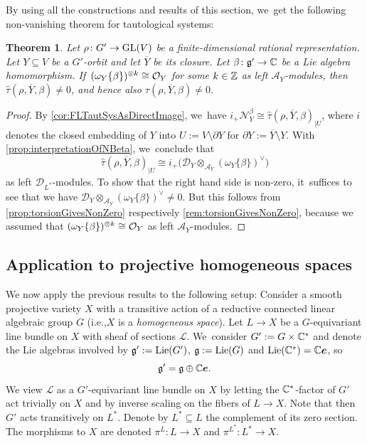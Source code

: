\documentclass[11pt]{article}
\newcommand{\ie}{i.e.,\xspace}
\newcommand{\bme}{{\boldsymbol{e}}}
\newtheorem{thm}{Theorem}[section]
\newcommand{\cA}{\mathscr{A}}
\newcommand{\Ell}{\mathscr{L}}
\newcommand{\frg}{\mathfrak{g}}
\DeclareMathOperator{\GL}{\textup{GL}}
\DeclareMathOperator{\Lie}{\textup{Lie}}
\newcommand\restr[2]{{#1_{| {#2}}}}
\begin{document}
By using all the constructions and results of this section, we~get the following non-vanishing theorem for tautological systems:

\begin{thm} \label{thm:nonZeroGeneralSetup}
Let $\rho \colon G' \to \GL(V)$ be a finite-dimensional rational representation. Let $Y \subseteq V$ be a $G'$-orbit and let $\overline{Y}$ be its closure. Let $\beta \colon \frg' \to \C$ be a Lie algebra homomorphism. If~$(\omega_Y\{\beta\})^{\otimes k} \cong \mathcal{O}_Y$ for some $k\in {\mathbb Z}$ as left $\cA_Y$\nobreakdash-mod\-ules,
then $\hat{\tau}(\rho, \overline{Y}, \beta) \neq 0$, and hence also $\tau(\rho, \overline{Y}, \beta) \neq 0$.
\end{thm}

\begin{proof}
By \cref{cor:FLTautSysAsDirectImage}, we~have $i_+ \mathscr N_Y^{\beta} \cong \restr{\hat\tau(\rho,\overline Y, \beta)}{U}$, where $i$ denotes the closed embedding of $Y$ into $U := V \setminus \partial Y$ for $\partial Y := \overline Y \setminus Y$. With \cref{prop:interpretationOfNBeta}, we~conclude that
\[
\restr{\hat{\tau}(\rho,\overline Y,\beta)}{U} \cong i_+\big(\mathscr{D}_{Y} \otimes_{\cA_{Y}} (\omega_{Y}\{\beta\})^\vee\big)
\]
as left $\mathscr{D}_{L^*}$\nobreakdash-mod\-ules. To show that the right hand side is non-zero, it~suffices to see that we have $\mathscr{D}_{Y} \otimes_{\cA_{Y}} (\omega_{Y}\{\beta\})^\vee \neq 0$.
But this follows from \cref{prop:torsionGivesNonZero} respectively \cref{rem:torsionGivesNonZero}, because we assumed that $(\omega_{Y}\{\beta\})^{\otimes k} \cong \mathcal{O}_Y$ as left $\cA_Y$\nobreakdash-mod\-ules.
\end{proof}

\subsection{Application to projective homogeneous spaces} \label{ssec:canSheafOnLineBdl}

We now apply the previous results to the following setup: Consider a smooth projective variety $X$ with a transitive action of a reductive connected linear algebraic group $G$ (\ie $X$ is a \emph{homogeneous space}). Let $L \to X$ be a $G$-equivariant line bundle on $X$ with sheaf of sections $\Ell$. We~consider $G' := G \times {\mathbb C}^*$ and denote the Lie algebras involved by $\frg' := \Lie(G')$, $\frg := \Lie(G)$ and $\Lie(\C^*) = \C \bme$, so
\[
\frg' = \frg \oplus \C \bme.
\]
We view $\Ell$ as a $G'$-equivariant line bundle on $X$ by letting the ${\mathbb C}^*$-factor of $G'$ act trivially on $X$ and by inverse scaling on the fibers of $L \to X$. Note that then $G'$ acts transitively on $L^*$.
Denote by $L^* \subseteq L$ the complement of its zero section. The morphisms to $X$ are denoted $\pi^L \colon L \to X$ and $\pi^{L^*} \colon L^* \to X$.
\end{document}
